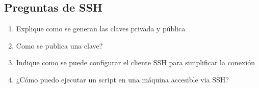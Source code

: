 \subsection{Preguntas de SSH}\label{preguntas-de-ssh}

\begin{enumerate}
\def\labelenumi{\arabic{enumi}.}
\itemsep1pt\parskip0pt
\item
  Explique como se generan las claves privada y pública
\item
  Como se publica una clave?
\item
  Indique como se puede configurar el cliente SSH para simplificar la
  conexión
\item
  ¿Cómo puedo ejecutar un script en una máquina accesible via SSH?
\end{enumerate}
